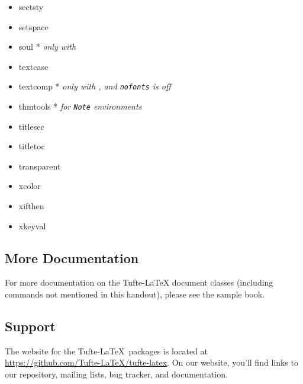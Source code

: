 \documentclass[a4paper]{tufte-handout}
\begin{document}
\begin{multicols}{2}
\begin{itemize}
    \item sectsty
    \item setspace
    \item soul * \textit{only with }
    \item textcase
    \item textcomp * \textit{only with , and \texttt{nofonts} is off}
    \item thmtools * \textit{for \texttt{Note} environments}
    \item titlesec
    \item titletoc
    \item transparent
    \item xcolor
    \item xifthen
    \item xkeyval
  \end{itemize}
\end{multicols}

\subsection{More Documentation}\label{ssec:more-documentation}
For more documentation on the Tufte-\LaTeX{} document classes (including commands not
mentioned in this handout), please see the sample book.

\subsection{Support}\label{sec:support}

The website for the Tufte-\LaTeX\ packages is located at
\url{https://github.com/Tufte-LaTeX/tufte-latex}. On our website, you'll find
links to our  repository, mailing lists, bug tracker, and documentation.

\pagebreak
\printbibliography[heading=bibnumbered]
\end{document}
